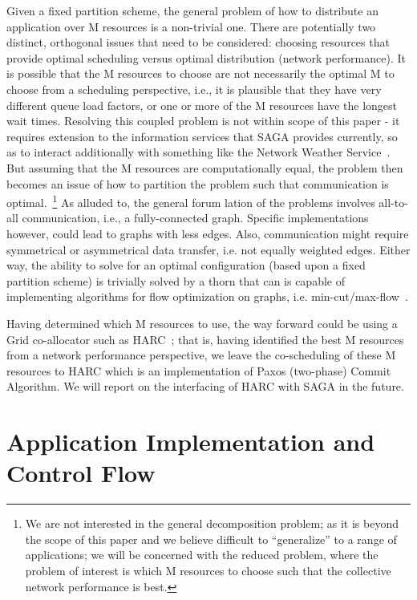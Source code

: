 \documentclass[conference,final]{IEEEtran}
\begin{document}
{Given a fixed partition scheme, the general problem of how to
distribute an application over M resources is a non-trivial one.
There are potentially two distinct, orthogonal issues that need to be
considered: choosing resources that provide optimal scheduling versus
optimal distribution (network performance).  It is possible that the M
resources to choose are not necessarily the optimal M to choose from a
scheduling perspective, i.e., it is plausible that they have very
different queue load factors, or one or more of the M resources have
the longest wait times.  Resolving this coupled problem is not within
scope of this paper - it requires extension to the information
services that SAGA provides currently, so as to interact additionally
with something like the Network Weather
Service~\cite{wolski_cluster05, wolski_acm03, wolski_ccgrid02}.
But assuming that the M resources are
computationally equal, the problem then becomes an issue of how to
partition the problem such that communication is optimal.~\footnote{We
  are not interested in the general decomposition problem; as it is
  beyond the scope of this paper and we believe difficult to
  ``generalize'' to a range of applications; we will be concerned with
  the reduced problem, where the problem of interest is which M
  resources to choose such that the collective network performance is
  best.}  As alluded to, the general forum lation of the problems
involves all-to-all communication, i.e., a fully-connected graph.
Specific implementations however, could lead to graphs with less
edges.  Also, communication might require symmetrical or asymmetrical
data transfer, i.e. not equally weighted edges.  Either way, the
ability to solve for an optimal configuration (based upon a fixed
partition scheme) is trivially solved by a thorn that can is capable
of implementing algorithms for flow optimization on graphs, i.e.
min-cut/max-flow~\cite{mincut-maxflow}.

Having determined which M resources to use, the way forward could be
using a Grid co-allocator such as HARC~\cite{harc_url}; that is,
having identified the best M resources from a network performance
perspective, we leave the co-scheduling of these M resources to HARC
which is an implementation of Paxos (two-phase) Commit Algorithm. We
will report on the interfacing of HARC with SAGA in the future.

\section{Application Implementation and Control Flow} 

}
\end{document}
